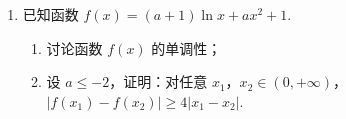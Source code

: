 \begin{description}
\begin{enumerate}[leftmargin=5pt]
\begin{enumerate}
\item 求椭圆 \(C\) 的焦距；
\item 如果 \(\overrightarrow{AF_2}=2\overrightarrow{F_2B}\)，求椭圆 \(C\) 的方程.
\end{enumerate}

        \item 已知函数 \(f(x)=(a+1)\ln x+ax^2+1\).

\begin{enumerate}
\item 讨论函数 \(f(x)\) 的单调性；
\item 设 \(a\leqslant -2\)，证明：对任意 \(x_1\)，\(x_2\in(0,+\infty)\)，\(|f(x_1)-f(x_2)|\geqslant 4|x_1-x_2|\).
\end{enumerate}

    \end{enumerate}

\end{description}

